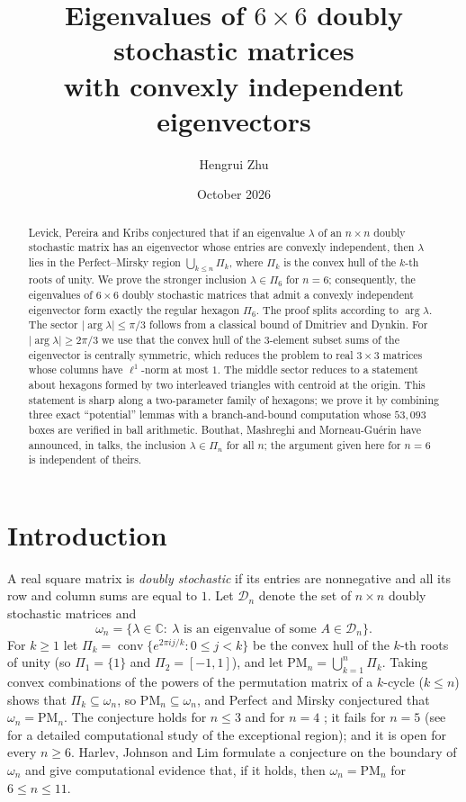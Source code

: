 \documentclass[11pt]{amsart}
\title[Convexly independent eigenvectors of $6\times6$ doubly stochastic matrices]{Eigenvalues of $6\times 6$ doubly stochastic matrices\\ with convexly independent eigenvectors}
\author{Hengrui Zhu}
\date{October 2026}
\theoremstyle{definition}
\theoremstyle{remark}
\newcommand{\C}{\mathbb{C}}
\newcommand{\cD}{\mathcal{D}}
\newcommand{\conv}{\operatorname{conv}}
\newcommand{\PM}{\mathrm{PM}}
\begin{document}
\begin{abstract}
Levick, Pereira and Kribs conjectured that if an eigenvalue $\lambda$ of an $n\times n$ doubly stochastic matrix has an eigenvector whose entries are convexly independent, then $\lambda$ lies in the Perfect--Mirsky region $\bigcup_{k\le n}\Pi_k$, where $\Pi_k$ is the convex hull of the $k$-th roots of unity. We prove the stronger inclusion $\lambda\in\Pi_6$ for $n=6$; consequently, the eigenvalues of $6\times6$ doubly stochastic matrices that admit a convexly independent eigenvector form exactly the regular hexagon $\Pi_6$. The proof splits according to $\arg\lambda$. The sector $\lvert\arg\lambda\rvert\le\pi/3$ follows from a classical bound of Dmitriev and Dynkin. For $\lvert\arg\lambda\rvert\ge2\pi/3$ we use that the convex hull of the $3$-element subset sums of the eigenvector is centrally symmetric, which reduces the problem to real $3\times3$ matrices whose columns have $\ell^1$-norm at most $1$. The middle sector reduces to a statement about hexagons formed by two interleaved triangles with centroid at the origin. This statement is sharp along a two-parameter family of hexagons; we prove it by combining three exact ``potential'' lemmas with a branch-and-bound computation whose $53{,}093$ boxes are verified in ball arithmetic. Bouthat, Mashreghi and Morneau-Guérin have announced, in talks, the inclusion $\lambda\in\Pi_n$ for all $n$; the argument given here for $n=6$ is independent of theirs.
\end{abstract}

\maketitle

\section{Introduction}

A real square matrix is \emph{doubly stochastic} if its entries are nonnegative and all its row and column sums are equal to $1$. Let $\cD_n$ denote the set of $n\times n$ doubly stochastic matrices and
\[
\omega_n=\{\lambda\in\C:\ \lambda \text{ is an eigenvalue of some } A\in\cD_n\}.
\]
For $k\ge1$ let $\Pi_k=\conv\{e^{2\pi ij/k}:0\le j<k\}$ be the convex hull of the $k$-th roots of unity (so $\Pi_1=\{1\}$ and $\Pi_2=[-1,1]$), and let $\PM_n=\bigcup_{k=1}^n\Pi_k$. Taking convex combinations of the powers of the permutation matrix of a $k$-cycle ($k\le n$) shows that $\Pi_k\subseteq\omega_n$, so $\PM_n\subseteq\omega_n$, and Perfect and Mirsky \cite{PM65} conjectured that $\omega_n=\PM_n$. The conjecture holds for $n\le3$ \cite{PM65} and for $n=4$ \cite{LPK15}; it fails for $n=5$ \cite{MR07} (see \cite{HJL} for a detailed computational study of the exceptional region); and it is open for every $n\ge6$. Harlev, Johnson and Lim \cite{HJL} formulate a conjecture on the boundary of $\omega_n$ and give computational evidence that, if it holds, then $\omega_n=\PM_n$ for $6\le n\le11$.
\end{document}
